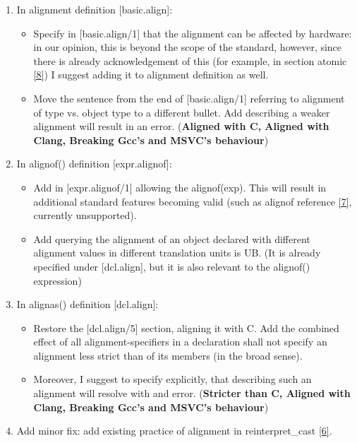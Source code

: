 \documentclass[11pt]{article}
\begin{document}
\begin{enumerate}
    \item In alignment definition [basic.align]: 
    \begin{itemize}
        \item Specify in [basic.align/1] that the alignment can be affected by hardware: in our opinion, this is beyond the scope of the standard, however, since there is already acknowledgement of this (for example, in section atomic \hyperlink{31.7.1/1,2}{[8]}) I suggest adding it to alignment definition as well.
    
        \item Move the sentence from the end of [basic.align/1] referring to alignment of type vs. object type to a different bullet. Add describing a weaker alignment will result in an error. (\textbf{Aligned with C, Aligned with Clang, Breaking Gcc's and MSVC's behaviour})
    \end{itemize}    
        
    \item In alignof() definition [expr.alignof]:
    \begin{itemize}
        \item Add in [expr.alignof/1] allowing the alignof(exp). This will result in additional standard features becoming valid (such as alignof reference \hyperlink{7.6.2.5/3}{[7]}, currently unsupported). 
    
        \item Add querying the alignment of an object declared with different alignment values in different translation units is UB. (It is already specified under [dcl.align], but it is also relevant to the alignof() expression)
        
    \end{itemize}
\item In alignas() definition [dcl.align]:   
    \begin{itemize}
    
        \item Restore the [dcl.align/5] section, aligning it with C. Add the combined effect of all alignment-specifiers in a declaration shall not specify an alignment less strict than of its members (in the broad sense). 
        
        \item Moreover, I suggest to specify explicitly, that describing such an alignment will resolve with and error. (\textbf{Stricter than C, Aligned with Clang, Breaking Gcc's and MSVC's behaviour})
    \end{itemize}
\item Add minor fix: add existing practice of alignment in reinterpret\_cast \hyperlink{7.6.1.9/7}{[6]}.


\end{enumerate}
\end{document}
